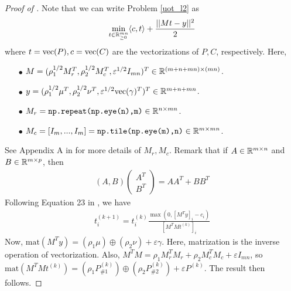 \begin{proof}[Proof of ]
Note that we can write Problem \eqref{uot_l2} as
\begin{align}
    \min_{t \in \mathbb R^{mn}_{\geq 0}} \langle c, t \rangle + \frac{|| Mt - y ||^2}{2}
\end{align}
where $t = \text{vec}(P), c = \text{vec}(C)$ are the vectorizations of $P, C$, respectively. Here,
\begin{itemize}
    \item[$\bullet$] $M = (\rho_1^{1/2} M_r^T, \rho_2^{1/2} M_c^T, \varepsilon^{1/2} I_{mn})^T \in \mathbb R^{(m + n + mn) \times (mn)}$.

    \item[$\bullet$] $y = (\rho_1^{1/2} \mu^T, \rho_2^{1/2} \nu^T, \varepsilon^{1/2} \text{vec}(\gamma)^T)^T \in \mathbb R^{m + n + mn}$.

    \item[$\bullet$] $M_r = \texttt{np.repeat(np.eye(n),m)} \in \mathbb R^{n \times mn}$.

    \item[$\bullet$] $M_c = [I_m, ..., I_m] = \texttt{np.tile(np.eye(m),n)} \in \mathbb R^{m \times mn}$.
\end{itemize}
See Appendix A in \citep{Chapel21} for more details of $M_r, M_c$.
Remark that if $A \in \mathbb R^{m \times n}$ and $B \in \mathbb R^{m \times p}$, then
\begin{align}
    (A, B) \begin{pmatrix}
        A^T \\
        B^T
    \end{pmatrix}
    = A A^T + B B^T
\end{align}
Following Equation 23 in \citep{Chapel21},  we have
\begin{align}
    t^{(k+1)}_i = t^{(k)}_i \frac{\max( 0, [M^T y]_i - c_i)}{[M^T M t^{(k)}]_i}
\end{align}
Now, $\text{mat}(M^T y) = (\rho_1 \mu) \oplus (\rho_2 \nu) + \varepsilon \gamma$.
Here, matrization is the inverse operation of vectorization. Also,
$M^T M = \rho_1 M_r^T M_r + \rho_2 M_c^T M_c + \varepsilon I_{mn}$, so
$\text{mat}(M^T M t^{(k)}) = (\rho_1 P_{\# 1}^{(k)}) \oplus (\rho_2 P_{\# 2}^{(k)})
+ \varepsilon P^{(k)} $. The result then follows.
\end{proof}

